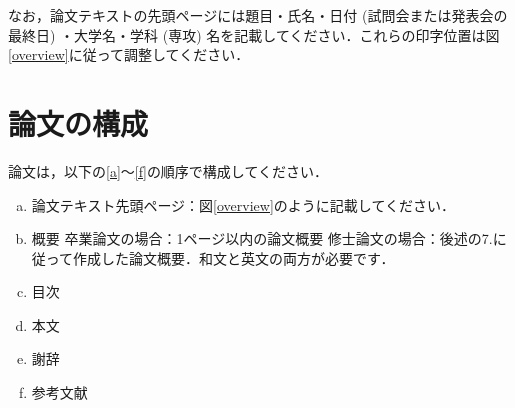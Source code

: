 \documentclass{kupaper}
\begin{document}
なお，論文テキストの先頭ページには題目・氏名・日付 (試問会または発表会の最終日) ・大学名・学科 (専攻) 名を記載してください．これらの印字位置は図\ref{overview}に従って調整してください．


\chapter{論文の構成} \label{論文の構成}
論文は，以下の\ref{a}～\ref{f}の順序で構成してください．



\begin{enumerate}[a.]
	\item 論文テキスト先頭ページ：図\ref{overview}のように記載してください．\label{a}
	\item 概要\label{b}
	      卒業論文の場合：1ページ以内の論文概要
	      修士論文の場合：後述の7.に従って作成した論文概要．和文と英文の両方が必要です．
	\item 目次\label{c}
	\item 本文\label{d}
	\item 謝辞\label{e}
	\item 参考文献\label{f}
\end{enumerate}
\end{document}
